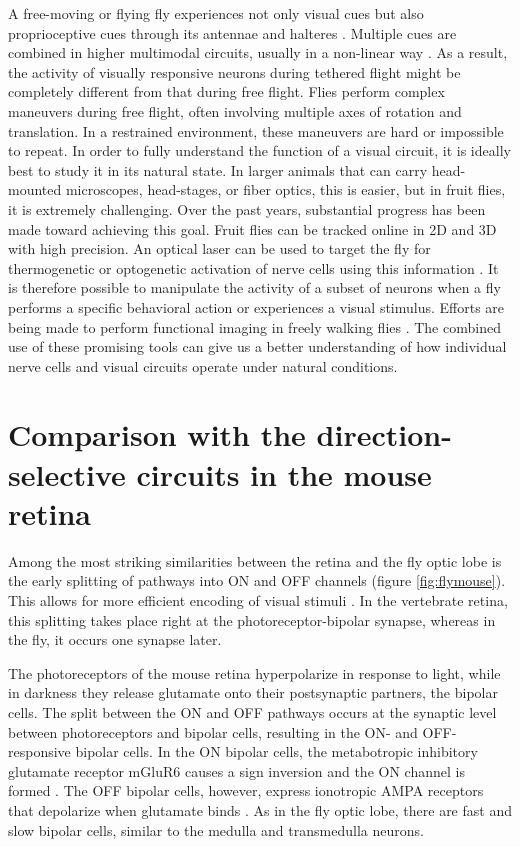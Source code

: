 A free-moving or flying fly experiences not only visual cues but also proprioceptive cues through its antennae and halteres \parencite{Mamiya2011, Sandeman1980}. Multiple cues are combined in higher multimodal circuits, usually in a non-linear way \parencite{Haag2010, Huston2009}. As a result, the activity of visually responsive neurons during tethered flight might be completely different from that during free flight. Flies perform complex maneuvers during free flight, often involving multiple axes of rotation and translation. In a restrained environment, these maneuvers are hard or impossible to repeat. In order to fully understand the function of a visual circuit, it is ideally best to study it in its natural state. In larger animals that can carry head-mounted microscopes, head-stages, or fiber optics, this is easier, but in fruit flies, it is extremely challenging. Over the past years, substantial progress has been made toward achieving this goal. Fruit flies can be tracked online in 2D and 3D with high precision. An optical laser can be used to target the fly for thermogenetic or optogenetic activation of nerve cells using this information \parencite{Bath2014, Stowers2014, Straw2011}. It is therefore possible to manipulate the activity of a subset of neurons when a fly performs a specific behavioral action or experiences a visual stimulus. Efforts are being made to perform functional imaging in freely walking flies \parencite{Grover2016}. The combined use of these promising tools can give us a better understanding of how individual nerve cells and visual circuits operate under natural conditions.

\section{Comparison with the direction-selective circuits in the mouse retina}
Among the most striking similarities between the retina and the fly optic lobe is the early splitting of pathways into ON and OFF channels (figure \ref{fig:flymouse}). This allows for more efficient encoding of visual stimuli \parencite{Gjorgjieva2014}. In the vertebrate retina, this splitting takes place right at the photoreceptor-bipolar synapse, whereas in the fly, it occurs one synapse later.

The photoreceptors of the mouse retina hyperpolarize in response to light, while in darkness they release glutamate onto their postsynaptic partners, the bipolar cells. The split between the ON and OFF pathways occurs at the synaptic level between photoreceptors and bipolar cells, resulting in the ON- and OFF-responsive bipolar cells. In the ON bipolar cells, the metabotropic inhibitory glutamate receptor mGluR6 causes a sign inversion and the ON channel is formed \parencite{Masu1995}. The OFF bipolar cells, however, express ionotropic AMPA receptors that depolarize when glutamate binds \parencite{Euler2014}. As in the fly optic lobe, there are fast and slow bipolar cells, similar to the medulla and transmedulla neurons.

